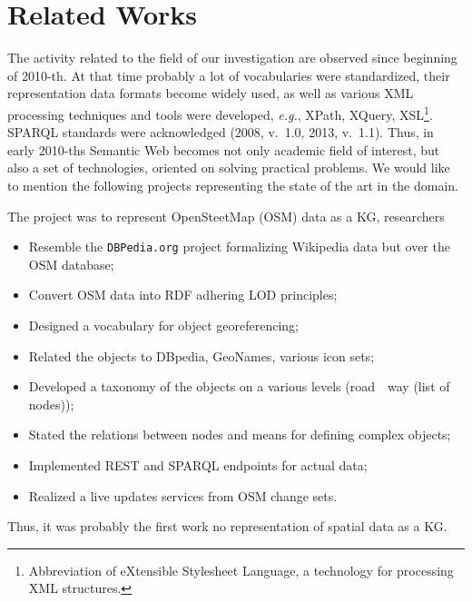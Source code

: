 \documentclass[
]{ceurart}
\begin{document}
\section{Related Works}

The activity related to the field of our investigation are observed since beginning of 2010-th.  At that time probably a lot of vocabularies were standardized, their representation data formats become widely used, as well as various XML processing techniques and tools were developed, \emph{e.g.}, XPath, XQuery, XSL\footnote{Abbreviation of eXtensible Stylesheet Language, a technology for processing XML structures.}.  SPARQL standards were acknowledged (2008, v.~1.0, 2013, v.~1.1).  Thus, in early 2010-ths Semantic Web becomes not only academic field of interest, but also a set of technologies, oriented on solving practical problems. We would like to mention the following projects representing the state of the art in the domain.

  The project \cite{lgd} was to represent OpenSteetMap (OSM) data as a KG, researchers
  \begin{itemize}
  \item Resemble the \texttt{DBPedia.org} project formalizing Wikipedia data but over the OSM database;
  \item Convert OSM data into RDF adhering LOD principles;
  \item Designed a vocabulary for object georeferencing;
  \item Related the objects to DBpedia, GeoNames, various icon sets;
  \item Developed a taxonomy of the objects on a various levels (road~\to~way (list of nodes)); %
  \item Stated the relations between nodes and means for defining complex objects;
  \item Implemented REST and SPARQL endpoints for actual data;
  \item Realized a live updates services from OSM change sets.
  \end{itemize}
  Thus, it was probably the first work no representation of spatial data as a KG.
\end{document}

